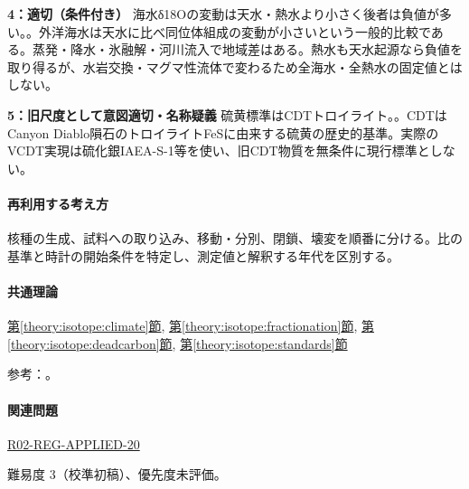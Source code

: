 \noindent\textbf{4：適切（条件付き）} 海水δ18Oの変動は天水・熱水より小さく後者は負値が多い。。外洋海水は天水に比べ同位体組成の変動が小さいという一般的比較である。蒸発・降水・氷融解・河川流入で地域差はある。熱水も天水起源なら負値を取り得るが、水岩交換・マグマ性流体で変わるため全海水・全熱水の固定値とはしない。\par

\noindent\textbf{5：旧尺度として意図適切・名称疑義} 硫黄標準はCDTトロイライト。。CDTはCanyon Diablo隕石のトロイライトFeSに由来する硫黄の歴史的基準。実際のVCDT実現は硫化銀IAEA-S-1等を使い、旧CDT物質を無条件に現行標準としない。\par

\paragraph{再利用する考え方} 核種の生成、試料への取り込み、移動・分別、閉鎖、壊変を順番に分ける。比の基準と時計の開始条件を特定し、測定値と解釈する年代を区別する。

\paragraph{共通理論} \hyperref[theory:isotope:climate]{第\ref*{theory:isotope:climate}節}, \hyperref[theory:isotope:fractionation]{第\ref*{theory:isotope:fractionation}節}, \hyperref[theory:isotope:deadcarbon]{第\ref*{theory:isotope:deadcarbon}節}, \hyperref[theory:isotope:standards]{第\ref*{theory:isotope:standards}節}

\par 参考：\cite{iso_oxygen,iso_deadcarbon,iso_standards1995,iso_vcdt,iso_hydrothermal}。

\paragraph{関連問題} \hyperref[q:r02-reg-applied-20]{R02-REG-APPLIED-20}

\par 難易度 3（校準初稿）、優先度未評価。
